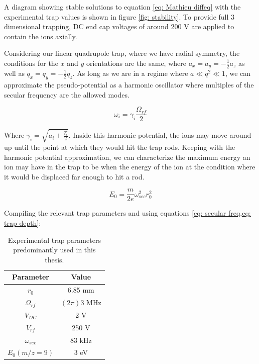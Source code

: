 A diagram showing stable solutions to equation \ref{eq: Mathieu diffeq} with the experimental trap values is shown in figure \ref{fig: stability}. To provide full 3 dimensional trapping, DC end cap voltages of around 200 V are applied to contain the ions axially.

Considering our linear quadrupole trap, where we have radial symmetry, the conditions for the $x$ and $y$ orientations are the same, where $a_x = a_y = -\frac{1}{2}a_z$ as well as $q_x = q_y = -\frac{1}{2}q_z$. As long as we are in a regime where $a \ll q^2 \ll 1$, we can approximate the pseudo-potential as a harmonic oscillator where multiples of the secular frequency are the allowed modes.

\begin{equation}
	\omega_i = \gamma_i \frac{\Omega_{rf}}{2}
	\label{eq: secular freq}
\end{equation}

Where $\gamma_i = \sqrt{a_i + \frac{q_i^2}{2}}$. Inside this harmonic potential, the ions may move around up until the point at which they would hit the trap rods. Keeping with the harmonic potential approximation, we can characterize the maximum energy an ion may have in the trap to be when the energy of the ion at the condition where it would be displaced far enough to hit a rod.

\begin{equation}
	E_0 = \frac{m}{2e} \omega_{sec}^2r_0^2
	\label{eq: trap depth}
\end{equation}

Compiling the relevant trap parameters and using equations \cref{eq: secular freq,eq: trap depth}:

\begin{table}[H]
	\centering
	\begin{tabular}{|c|c|}
		Parameter & Value \\
		\hline
		$r_0$ & 6.85 mm \\
		$\Omega_{rf}$ & $(2 \pi) 3$ MHz \\
		$V_{DC}$ & 2 V \\
		$V_{rf}$ & 250 V \\
		$\omega_{sec}$ & 83 kHz \\
		$E_0(m/z=9)$ & 3 eV
	\end{tabular}
	\caption{Experimental trap parameters predominantly used in this thesis.}
	\label{tab: trap params}
\end{table}

